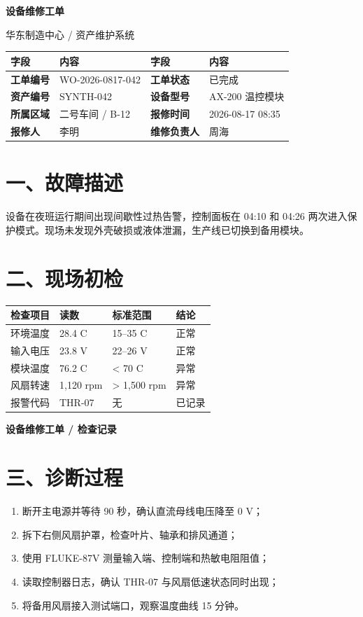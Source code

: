 \documentclass[12pt,a4paper]{article}
\begin{document}
{\fontsize{22}{27}\selectfont\bfseries 设备维修工单}\par\vspace{3mm}
{\color{gray}\small 华东制造中心 / 资产维护系统}\par\vspace{5mm}{\color{black}\rule{\textwidth}{1.2pt}}
\vspace{6mm}
\begin{tabular}{|>{\bfseries}p{28mm}|p{50mm}|>{\bfseries}p{28mm}|p{50mm}|}\hline
\rowcolor{blue!12} \bfseries 字段 & \bfseries 内容 & \bfseries 字段 & \bfseries 内容\\\hline
工单编号 & WO-2026-0817-042 & 工单状态 & 已完成\\\hline
资产编号 & SYNTH-042 & 设备型号 & AX-200 温控模块\\\hline
所属区域 & 二号车间 / B-12 & 报修时间 & 2026-08-17 08:35\\\hline
报修人 & 李明 & 维修负责人 & 周海\\\hline
\end{tabular}
\vspace{8mm}
\section*{一、故障描述}
设备在夜班运行期间出现间歇性过热告警，控制面板在 04:10 和 04:26 两次进入保护模式。现场未发现外壳破损或液体泄漏，生产线已切换到备用模块。
\section*{二、现场初检}
\begin{tabular}{|p{40mm}|p{38mm}|p{40mm}|p{30mm}|}\hline
\rowcolor{gray!15} 检查项目 & 读数 & 标准范围 & 结论\\\hline
环境温度 & 28.4 C & 15--35 C & 正常\\\hline
输入电压 & 23.8 V & 22--26 V & 正常\\\hline
模块温度 & 76.2 C & < 70 C & 异常\\\hline
风扇转速 & 1,120 rpm & > 1,500 rpm & 异常\\\hline
报警代码 & THR-07 & 无 & 已记录\\\hline
\end{tabular}
\newpage
{\fontsize{18}{22}\selectfont\bfseries 设备维修工单 / 检查记录}\par\vspace{8mm}
\section*{三、诊断过程}
\begin{enumerate}
\item 断开主电源并等待 90 秒，确认直流母线电压降至 0 V；
\item 拆下右侧风扇护罩，检查叶片、轴承和排风通道；
\item 使用 FLUKE-87V 测量输入端、控制端和热敏电阻阻值；
\item 读取控制器日志，确认 THR-07 与风扇低速状态同时出现；
\item 将备用风扇接入测试端口，观察温度曲线 15 分钟。
\end{enumerate}
\end{document}
